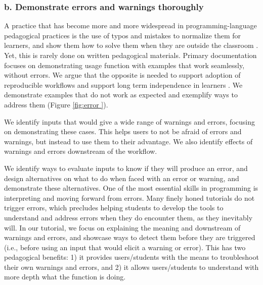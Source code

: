 \documentclass[12pt]{article}
\begin{document}

\subsubsection*{b. Demonstrate errors and warnings thoroughly}

A practice that has become more and more widespread in programming-language pedagogical practices
is the use of typos and mistakes to normalize them for learners, and show them how
to solve them when they are outside the classroom \citep{shannon2015live}.
Yet, this is rarely done on written pedagogical materials.
Primary documentation focuses on demonstrating usage function with examples that
work seamlessly, without errors. We argue that the opposite is needed to support
adoption of reproducible workflows and support long term independence in learners
\citep{gaspar2007restoring}.
We demonstrate examples that do not work
as expected and exemplify ways to address them (Figure \ref{fig:error
}).

We identify inputs that would give
a wide range of warnings and errors, focusing on demonstrating these cases. This
helps users to not be afraid of errors and warnings, but instead to use them to
their advantage.
We also identify effects of warnings and errors downstream of the workflow.

We identify ways to evaluate inputs to know if they will produce an error, and design
alternatives on what to do when faced with an error or warning, and demonstrate
these alternatives.
One of the most essential skills in programming is interpreting and moving forward
from errors.
Many finely honed tutorials do not trigger errors, which precludes helping students
to develop the tools to understand and address errors when they do encounter them,
as they inevitably will.
In our tutorial, we focus on explaining the meaning and downstream of warnings and errors, and
 showcase ways to detect them before they are triggered (i.e., before using an input
  that would elicit a warning or error). This has two pedagogical benefits:
1) it provides users/students with the means to troubleshoot their own warnings and errors, and
2) it allows users/students to understand with more depth what the function is doing.

\end{document}
